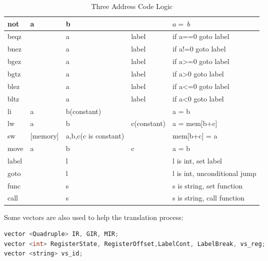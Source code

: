 \documentclass{article}
\begin{document}
\begin{table}[!h]
\begin{tabular}{|l|l|l|l|l|}
    not    & a           & b                    & ~             & $a = ~b   $                   \\ \hline
    beqz   & ~           & a                    & label         & if a==0 goto label           \\ \hline
    bnez   & ~           & a                    & label         & if a!=0 goto label           \\ \hline
    bgez   & ~           & a                    & label         & if a>=0 goto label           \\ \hline
    bgtz   & ~           & a                    & label         & if a>0 goto label            \\ \hline
    blez   & ~           & a                    & label         & if a<=0 goto label           \\ \hline
    bltz   & ~           & a                    & label         & if a<0 goto label            \\ \hline
    li     & a           & b(constant)          & ~             & a = b                        \\ \hline
    lw     & a           & b                    & c(constant)   & a = mem[b+c]                 \\ \hline
    sw     & [memory]    & a,b,c(c is constant) & ~             & mem[b+c] = a                 \\ \hline
    move   & a           & b                    & c             & a = b                        \\ \hline
    label  & ~           & l                    & ~             & l is int, set label          \\ \hline
    goto   & ~           & l                    & ~             & l is int, unconditional jump \\ \hline
    func   & ~           & s                    & ~             & s is string, set function    \\ \hline
    call   & ~           & s                    & ~             & s is string, call function   \\ \hline
    \end{tabular}
    \caption{Three Address Code Logic}
\end{table}

Some vectors are also used to help the translation process:
\begin{lstlisting}[language = C] 
vector <Quadruple> IR, GIR, MIR;
vector <int> RegisterState, RegisterOffset,LabelCont, LabelBreak, vs_reg; 
vector <string> vs_id;
\end{lstlisting}
\end{document}
